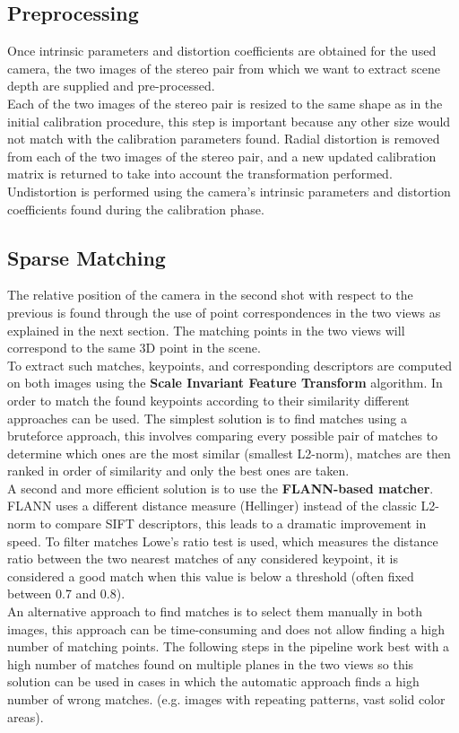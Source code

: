 \documentclass[12pt]{amsart}
\begin{document}
\subsection{Preprocessing}
Once intrinsic parameters and distortion coefficients are obtained for the used camera, 
the two images of the stereo pair from which we want to extract scene depth are supplied and pre-processed.
\\
Each of the two images of the stereo pair is resized to the same shape as in the initial calibration procedure, this step is important because any other size would not match
with the calibration parameters found.
Radial distortion is removed from each of the two images of the stereo pair, 
and a new updated calibration matrix is returned to take into account the transformation performed.
Undistortion is performed using the camera's intrinsic parameters and distortion coefficients found during the calibration phase.
\subsection{Sparse Matching}
The relative position of the camera in the second shot with respect to the previous is found through the use of point correspondences in the two views as explained in the next section.
The matching points in the two views will correspond to the same 3D point in the scene.
\\To extract such matches, keypoints, and corresponding descriptors are computed on both images using the \textbf{Scale Invariant Feature Transform} algorithm.
In order to match the found keypoints according to their similarity different approaches can be used. The simplest solution is to find matches using a bruteforce approach,
this involves comparing every possible pair of matches to determine which ones are the most similar (smallest L2-norm), matches are then ranked in order of similarity and only the best ones are taken.
\\
A second and more efficient solution is to use the \textbf{FLANN-based matcher}. FLANN uses a different distance measure (Hellinger) instead of the classic L2-norm to compare SIFT descriptors, 
this leads to a dramatic improvement in speed. To filter matches Lowe's ratio test is used, which measures the distance ratio between the two nearest matches of any considered
keypoint, it is considered a good match when this value is below a threshold (often fixed between 0.7 and 0.8).
\\
An alternative approach to find matches is to select them manually in both images, this approach can be time-consuming and does not allow finding a high number of matching points.
The following steps in the pipeline work best with a high number of matches found on multiple planes in the two views so this solution can be used in cases in which the automatic approach 
finds a high number of wrong matches. (e.g. images with repeating patterns, vast solid color areas).
\end{document}
